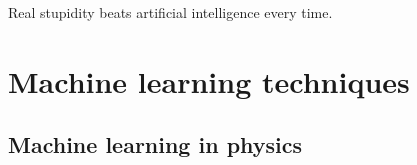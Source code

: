 \documentclass[11pt, a4paper]{report} %
\begin{document}
\begin{table}[tb!]
\centering
{}
\caption{Number of states required for a given sum rule saturation in the XXZ model with \(\Delta=0.6\) and \(S_{\mathrm{tot}}^z=0.1\).
In parentheses are the fraction of the Hilbert space fraction this represents.
Table reproduced from~\cite{Caux2009}.
}\label{table:saturation}
\end{table}

\begin{savequote}[50mm]
Real stupidity beats artificial intelligence every time.
\end{savequote}


\chapter{Machine learning techniques}\label{chap:machine_learning}

\section{Machine learning in physics}
\end{document}
